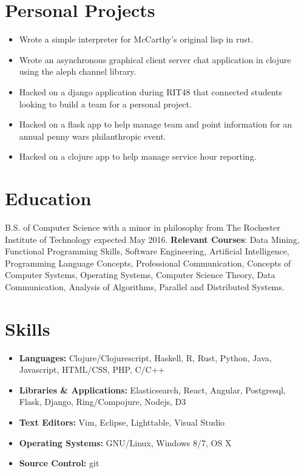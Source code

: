 \documentclass[line]{res}
\begin{document}

\begin{resume}
\begin{multicols}{2}

\section{Personal Projects}
\begin{itemize}
    \item Wrote a simple interpreter for McCarthy's original lisp in rust.
    \item Wrote an asynchronous graphical client server chat application in clojure using the aleph channel library.
    \item Hacked on a django application during RIT48 that connected students looking to build a team for a personal project. 
    \item Hacked on a flask app to help manage team and point information for an annual penny wars philanthropic event.
    \item Hacked on a clojure app to help manage service hour reporting.
\end{itemize}

\section{Education}
B.S. of Computer Science with a minor in philosophy from The Rochester Institute of Technology expected May 2016. 
\textbf{Relevant Courses}: Data Mining, Functional Programming Skills, Software Engineering, Artificial Intelligence, 
Programming Language Concepts, Professional Communication, Concepts of Computer Systems, Operating Systems, 
Computer Science Theory, Data Communication, Analysis of Algorithms, Parallel and Distributed Systems.

\section{Skills}
\begin{itemize}
    \item \textbf{Languages:} Clojure/Clojurescript, Haskell, R, Rust, Python, Java, Javascript, HTML/CSS, PHP, C/C++
    \item \textbf{Libraries \& Applications:}  Elasticsearch, React, Angular, Postgresql, Flask, Django, Ring/Compojure, Nodejs, D3
    \item \textbf{Text Editors:} Vim, Eclipse, Lighttable, Visual Studio
    \item \textbf{Operating Systems:} GNU/Linux, Windows 8/7, OS X
    \item \textbf{Source Control:} git
\end{itemize}


\end{multicols}
\end{resume}
\end{document}
